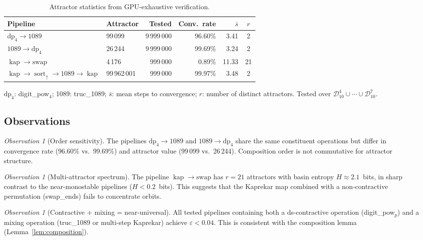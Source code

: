 \documentclass[11pt,a4paper]{amsart}
\theoremstyle{plain}
\theoremstyle{definition}
\theoremstyle{remark}
\newtheorem{observation}[theorem]{Observation}
\DeclareMathOperator{\sort}{sort}
\DeclareMathOperator{\kap}{kap}
\begin{document}
\begin{table}[ht]
\centering
\caption{Attractor statistics from GPU-exhaustive verification.}\label{tab:attractors}
\begin{tabular}{@{}llrrrc@{}}
\toprule
Pipeline & Attractor & Tested & Conv.\ rate & $\bar{s}$ & $r$ \\
\midrule
$\text{dp}_4 \to \text{1089}$ & 99\,099 & 9\,999\,000 & 96.60\% & 3.41 & 2 \\
$\text{1089} \to \text{dp}_4$ & 26\,244 & 9\,999\,000 & 99.69\% & 3.24 & 2 \\
$\kap \to \text{swap}$ & 4\,176 & 999\,000 & 0.89\% & 11.33 & 21 \\
$\kap \to \sort_\uparrow \to \text{1089} \to \kap$ & 99\,962\,001 & 999\,000 & 99.97\% & 3.48 & 2 \\
\bottomrule
\end{tabular}

\smallskip
\footnotesize
$\text{dp}_4$: digit\_pow$_4$; 1089: truc\_1089; $\bar{s}$: mean steps to
convergence; $r$: number of distinct attractors. Tested over
$\mathcal{D}_{10}^4 \cup \cdots \cup \mathcal{D}_{10}^7$.
\end{table}

\subsection{Observations}

\begin{observation}[Order sensitivity]\label{obs:order}
The pipelines $\text{dp}_4 \to \text{1089}$ and
$\text{1089} \to \text{dp}_4$ share the same constituent operations but
differ in convergence rate (96.60\% vs.\ 99.69\%) and attractor value
(99\,099 vs.\ 26\,244). Composition order is not commutative for attractor
structure.
\end{observation}

\begin{observation}[Multi-attractor spectrum]\label{obs:multi}
The pipeline $\kap \to \text{swap}$ has $r = 21$ attractors with basin
entropy $H \approx 2.1$~bits, in sharp contrast to the near-monostable
pipelines ($H < 0.2$~bits). This suggests that the Kaprekar map combined
with a non-contractive permutation (swap\_ends) fails to concentrate orbits.
\end{observation}

\begin{observation}[Contractive + mixing = near-universal]\label{obs:mix}
All tested pipelines containing both a ds-contractive operation
(digit\_pow$_p$) and a mixing operation (truc\_1089 or multi-step Kaprekar)
achieve $\varepsilon < 0.04$. This is consistent with the composition
lemma (Lemma~\ref{lem:composition}).
\end{observation}
\end{document}
